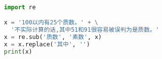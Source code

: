 \begin{spacing}{0.8}
\begin{lstlisting}[language=Python]

import re

x = '100以内有25个质数。' + \
  '不实际计算的话,其中51和91很容易被误判为是质数。'
x = re.sub('质数', '素数', x)
x = x.replace('其中', '')
print(x)

\end{lstlisting}
\end{spacing}
